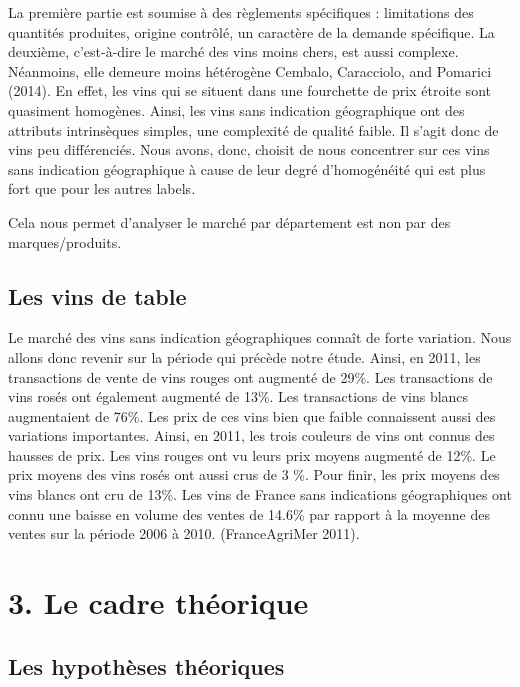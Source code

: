 \documentclass[11pt,]{article}
\begin{document}
La première partie est soumise à des règlements spécifiques :
limitations des quantités produites, origine contrôlé, un caractère de
la demande spécifique. La deuxième, c'est-à-dire le marché des vins
moins chers, est aussi complexe. Néanmoins, elle demeure moins
hétérogène Cembalo, Caracciolo, and Pomarici (2014). En effet, les vins
qui se situent dans une fourchette de prix étroite sont quasiment
homogènes. Ainsi, les vins sans indication géographique ont des
attributs intrinsèques simples, une complexité de qualité faible. Il
s'agit donc de vins peu différenciés. Nous avons, donc, choisit de nous
concentrer sur ces vins sans indication géographique à cause de leur
degré d'homogénéité qui est plus fort que pour les autres labels.

Cela nous permet d'analyser le marché par département est non par des
marques/produits.

\hypertarget{les-vins-de-table}{%
\subsection{Les vins de table}\label{les-vins-de-table}}

Le marché des vins sans indication géographiques connaît de forte
variation. Nous allons donc revenir sur la période qui précède notre
étude. Ainsi, en 2011, les transactions de vente de vins rouges ont
augmenté de 29\%. Les transactions de vins rosés ont également augmenté
de 13\%. Les transactions de vins blancs augmentaient de 76\%. Les prix
de ces vins bien que faible connaissent aussi des variations
importantes. Ainsi, en 2011, les trois couleurs de vins ont connus des
hausses de prix. Les vins rouges ont vu leurs prix moyens augmenté de
12\%. Le prix moyens des vins rosés ont aussi crus de 3 \%. Pour finir,
les prix moyens des vins blancs ont cru de 13\%. Les vins de France sans
indications géographiques ont connu une baisse en volume des ventes de
14.6\% par rapport à la moyenne des ventes sur la période 2006 à 2010.
(FranceAgriMer 2011).

\hypertarget{le-cadre-theorique}{%
\section{3. Le cadre théorique}\label{le-cadre-theorique}}

\hypertarget{les-hypotheses-theoriques}{%
\subsection{Les hypothèses théoriques}\label{les-hypotheses-theoriques}}
\end{document}
